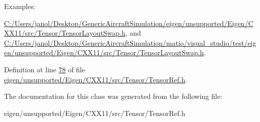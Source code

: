 \begin{Desc}
\item[Examples\+: ]\par
\hyperlink{_c_1_2_users_2janol_2_desktop_2_generic_aircraft_simulation_2eigen_2unsupported_2_eigen_2_c_x_x1995ff76eaccdd7a9ea13b307626fb9df}{C\+:/\+Users/janol/\+Desktop/\+Generic\+Aircraft\+Simulation/eigen/unsupported/\+Eigen/\+C\+X\+X11/src/\+Tensor/\+Tensor\+Layout\+Swap.\+h}, and \hyperlink{_c_1_2_users_2janol_2_desktop_2_generic_aircraft_simulation_2matio_2visual_studio_2test_2eigen_2286551beec45c5254494adb391cdc80f}{C\+:/\+Users/janol/\+Desktop/\+Generic\+Aircraft\+Simulation/matio/visual\+\_\+studio/test/eigen/unsupported/\+Eigen/\+C\+X\+X11/src/\+Tensor/\+Tensor\+Layout\+Swap.\+h}.\end{Desc}


Definition at line \hyperlink{eigen_2unsupported_2_eigen_2_c_x_x11_2src_2_tensor_2_tensor_ref_8h_source_l00078}{78} of file \hyperlink{eigen_2unsupported_2_eigen_2_c_x_x11_2src_2_tensor_2_tensor_ref_8h_source}{eigen/unsupported/\+Eigen/\+C\+X\+X11/src/\+Tensor/\+Tensor\+Ref.\+h}.



The documentation for this class was generated from the following file\+:\begin{DoxyCompactItemize}
\item 
eigen/unsupported/\+Eigen/\+C\+X\+X11/src/\+Tensor/\+Tensor\+Ref.\+h\end{DoxyCompactItemize}
